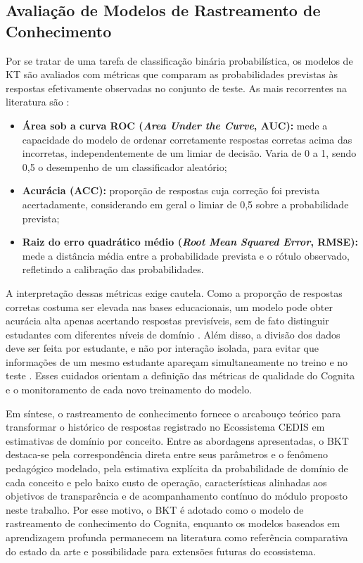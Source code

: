 \subsection{Avaliação de Modelos de Rastreamento de Conhecimento}
\label{subsec:avaliacao-kt}

Por se tratar de uma tarefa de classificação binária probabilística, os modelos de KT são avaliados com métricas que comparam as probabilidades previstas às respostas efetivamente observadas no conjunto de teste. As mais recorrentes na literatura são \cite{shen_assessing_2022, cui_rebalancing_2025, liao_naviedu_2026}:

\begin{itemize}
    \item \textbf{Área sob a curva ROC (\textit{Area Under the Curve}, AUC):} mede a capacidade do modelo de ordenar corretamente respostas corretas acima das incorretas, independentemente de um limiar de decisão. Varia de 0 a 1, sendo 0,5 o desempenho de um classificador aleatório;
    \item \textbf{Acurácia (ACC):} proporção de respostas cuja correção foi prevista acertadamente, considerando em geral o limiar de 0,5 sobre a probabilidade prevista;
    \item \textbf{Raiz do erro quadrático médio (\textit{Root Mean Squared Error}, RMSE):} mede a distância média entre a probabilidade prevista e o rótulo observado, refletindo a calibração das probabilidades.
\end{itemize}

A interpretação dessas métricas exige cautela. Como a proporção de respostas corretas costuma ser elevada nas bases educacionais, um modelo pode obter acurácia alta apenas acertando respostas previsíveis, sem de fato distinguir estudantes com diferentes níveis de domínio \cite{cui_rebalancing_2025}. Além disso, a divisão dos dados deve ser feita por estudante, e não por interação isolada, para evitar que informações de um mesmo estudante apareçam simultaneamente no treino e no teste \cite{nagatani_augmenting_2019, cao_multi-granularity_2025}. Esses cuidados orientam a definição das métricas de qualidade do Cognita e o monitoramento de cada novo treinamento do modelo.

Em síntese, o rastreamento de conhecimento fornece o arcabouço teórico para transformar o histórico de respostas registrado no Ecossistema CEDIS em estimativas de domínio por conceito. Entre as abordagens apresentadas, o BKT destaca-se pela correspondência direta entre seus parâmetros e o fenômeno pedagógico modelado, pela estimativa explícita da probabilidade de domínio de cada conceito e pelo baixo custo de operação, características alinhadas aos objetivos de transparência e de acompanhamento contínuo do módulo proposto neste trabalho. Por esse motivo, o BKT é adotado como o modelo de rastreamento de conhecimento do Cognita, enquanto os modelos baseados em aprendizagem profunda permanecem na literatura como referência comparativa do estado da arte e possibilidade para extensões futuras do ecossistema.
